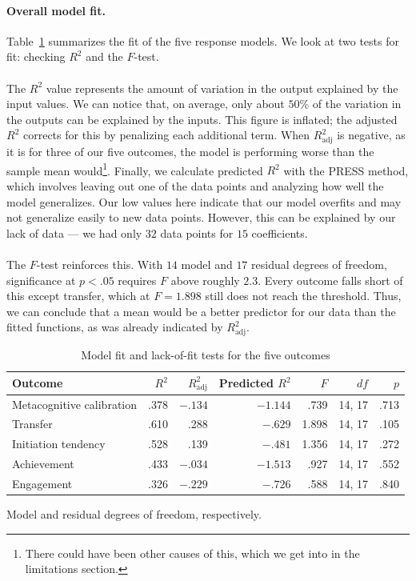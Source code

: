 \documentclass[12pt]{article}
\begin{document}
\paragraph{Overall model fit.}
Table~\ref{tab:model-adequacy} summarizes the fit of the five response
models. We look at two tests for fit: checking $R^2$ and the $F$-test.
\\\\
The $R^2$ value represents the amount of variation in the output explained by the input values. We can notice that, on average, only about $50\%$ of the variation in the outputs can be explained by the inputs. This figure is inflated; the adjusted $R^2$ corrects for this by penalizing each additional term. When $R^2_{\text{adj}}$ is negative, as it is for three of our five outcomes, the model is performing worse than the sample mean would\footnote{There could have been other causes of this, which we get into in the limitations section.}. Finally, we calculate predicted $R^2$ with the PRESS method, which involves leaving out one of the data points and analyzing how well the model generalizes. Our low values here indicate that our model overfits and may not generalize easily to new data points. However, this can be explained by our lack of data --- we had only $32$ data points for $15$ coefficients.
\\\\
The $F$-test reinforces this. With $14$ model and $17$ residual degrees of freedom, significance at $p<.05$ requires $F$ above roughly $2.3$. Every outcome falls short of this except transfer, which at $F=1.898$ still does not reach the threshold. Thus, we can conclude that a mean would be a better predictor for our data than the fitted functions, as was already indicated by $R^2_{\text{adj}}$.

\begin{table}[htbp]
\centering
\caption{Model fit and lack-of-fit tests for the five outcomes}
\label{tab:model-adequacy}
\begin{threeparttable}
\begin{tabular}{lrrrrrr}
\toprule
Outcome & $R^2$ & $R^2_{\text{adj}}$ & Predicted $R^2$ & $F$ & $df$\tnote{a} & $p$ \\
\midrule
Metacognitive calibration & .378 & $-.134$ & $-1.144$ & .739 & 14, 17 & .713 \\
Transfer                  & .610 &  .288   & $-.629$  & 1.898 & 14, 17 & .105 \\
Initiation tendency       & .528 &  .139   & $-.481$  & 1.356 & 14, 17 & .272 \\
Achievement               & .433 & $-.034$ & $-1.513$ & .927 & 14, 17 & .552 \\
Engagement                & .326 & $-.229$ & $-.726$  & .588 & 14, 17 & .840 \\
\bottomrule
\end{tabular}
\begin{tablenotes}\footnotesize
\item[a] Model and residual degrees of freedom, respectively.
\end{tablenotes}
\end{threeparttable}
\end{table}
\end{document}
